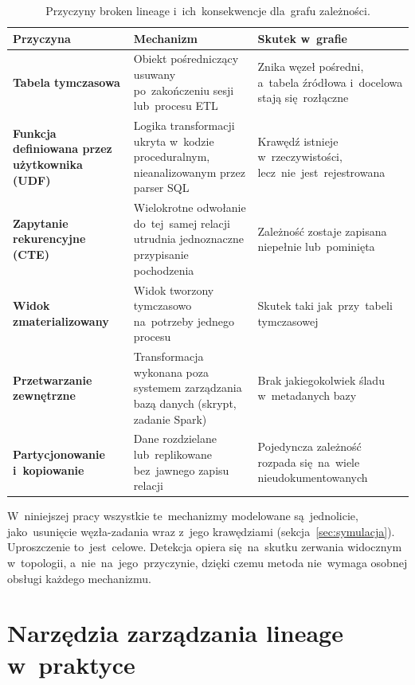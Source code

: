 \documentclass[polish,master,a4paper,oneside]{ppfcmthesis}
\renewcommand{\_}{\origtextunderscore\ifmmode\else\allowbreak\fi}
\begin{document}
\begin{table}[ht]
\centering
\caption{Przyczyny broken lineage i~ich~konsekwencje dla~grafu zależności.}
\label{tab:taksonomia}
\small
\begin{tabular}{@{}>{\raggedright\arraybackslash}p{3.1cm}
                >{\raggedright\arraybackslash}p{5.3cm}
                >{\raggedright\arraybackslash}p{4.4cm}@{}}
\toprule
\textbf{Przyczyna} & \textbf{Mechanizm} & \textbf{Skutek w~grafie} \\
\midrule
\textbf{Tabela tymczasowa} &
  Obiekt pośredniczący usuwany po~zakończeniu sesji lub~procesu
  ETL~\cite{Boinski2025,Dutkiewicz2026} &
  Znika węzeł pośredni, a~tabela źródłowa i~docelowa stają się~rozłączne \\
\addlinespace[4pt]
\textbf{Funkcja definiowana przez użytkownika (UDF)} &
  Logika transformacji ukryta w~kodzie proceduralnym, nieanalizowanym
  przez parser SQL~\cite{Yamada2023} &
  Krawędź istnieje w~rzeczywistości, lecz~nie~jest~rejestrowana \\
\addlinespace[4pt]
\textbf{Zapytanie rekurencyjne (CTE)} &
  Wielokrotne odwołanie do~tej~samej relacji utrudnia jednoznaczne
  przypisanie pochodzenia~\cite{Dietrich2022} &
  Zależność zostaje zapisana niepełnie lub~pominięta \\
\addlinespace[4pt]
\textbf{Widok zmaterializowany} &
  Widok tworzony tymczasowo na~potrzeby jednego procesu~\cite{Dutkiewicz2026} &
  Skutek taki jak~przy~tabeli tymczasowej \\
\addlinespace[4pt]
\textbf{Przetwarzanie zewnętrzne} &
  Transformacja wykonana poza systemem zarządzania bazą danych (skrypt,
  zadanie Spark) &
  Brak jakiegokolwiek śladu w~metadanych bazy \\
\addlinespace[4pt]
\textbf{Partycjonowanie i~kopiowanie} &
  Dane rozdzielane lub~replikowane bez~jawnego zapisu
  relacji~\cite{Dutkiewicz2026} &
  Pojedyncza zależność rozpada się~na~wiele nieudokumentowanych \\
\bottomrule
\end{tabular}
\end{table}

W~niniejszej pracy wszystkie te~mechanizmy modelowane są~jednolicie,
jako~usunięcie węzła-zadania wraz z~jego krawędziami (sekcja~\ref{sec:symulacja}).
Uproszczenie to~jest~celowe. Detekcja opiera się~na~skutku zerwania
widocznym w~topologii, a~nie~na~jego~przyczynie, dzięki czemu metoda
nie~wymaga osobnej obsługi każdego mechanizmu.

\section{Narzędzia zarządzania lineage w~praktyce}
\label{sec:narzedzia}
\end{document}

